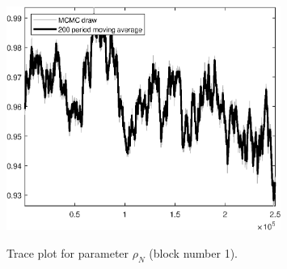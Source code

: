 \begin{figure}[H]
\centering
  \includegraphics[width=0.8\textwidth]{BRS_est_shopping/graphs/TracePlot_rho_N_blck_1}\\
    \caption{Trace plot for parameter ${\rho_N}$ (block number 1).}
\end{figure}
